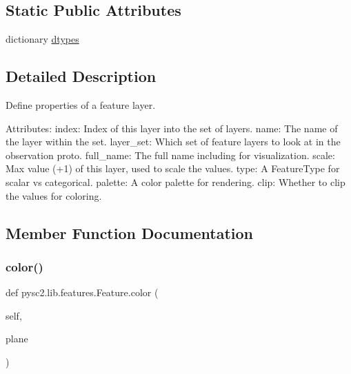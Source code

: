 \subsection*{Static Public Attributes}
\begin{DoxyCompactItemize}
\item 
dictionary \mbox{\hyperlink{classpysc2_1_1lib_1_1features_1_1_feature_a3d5ce47166a2026a4370d0bfb1857a91}{dtypes}}
\end{DoxyCompactItemize}


\subsection{Detailed Description}
\begin{DoxyVerb}Define properties of a feature layer.

Attributes:
  index: Index of this layer into the set of layers.
  name: The name of the layer within the set.
  layer_set: Which set of feature layers to look at in the observation proto.
  full_name: The full name including for visualization.
  scale: Max value (+1) of this layer, used to scale the values.
  type: A FeatureType for scalar vs categorical.
  palette: A color palette for rendering.
  clip: Whether to clip the values for coloring.
\end{DoxyVerb}
 

\subsection{Member Function Documentation}
\mbox{\label{classpysc2_1_1lib_1_1features_1_1_feature_a08f6ecbdfc49803c7221b5948d91df9e}} 
\subsubsection{\texorpdfstring{color()}{color()}}
{\footnotesize\ttfamily def pysc2.\+lib.\+features.\+Feature.\+color (\begin{DoxyParamCaption}\item[{}]{self,  }\item[{}]{plane }\end{DoxyParamCaption})}

\mbox{\label{classpysc2_1_1lib_1_1features_1_1_feature_a840859c8cc0f2bc3c80b665a38e879d7}} 
